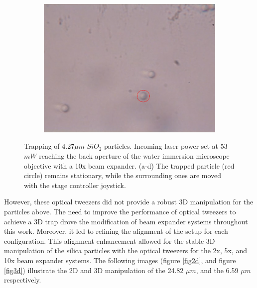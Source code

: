 \documentclass[letterpaper,12pt,oneside]{book}
\begin{document}
\begin{figure}[H]
\begin{subfigure}[b]{0.5\linewidth}
    \centering
    \includegraphics[scale=0.22]{427particles/4.png}
    \caption{}
    \label{fig7:d} 
  \end{subfigure} 
  \caption{Trapping of 4.27$\mu m$ $SiO_2$ particles. Incoming laser power set at 53 $mW$ reaching the back aperture of the water immersion microscope objective with a 10x beam expander. (a-d) The trapped particle (red circle) remains stationary, while the surrounding ones are moved with the stage controller joystick.}
  \label{figur427} 
\end{figure}
However, these optical tweezers did not provide a robust 3D manipulation for the particles above.
The need to improve the performance of optical tweezers to achieve a 3D trap drove the modification of beam expander systems throughout this work. Moreover, it led to refining the alignment of the setup for each configuration. This alignment enhancement allowed for the stable 3D manipulation of the silica particles with the optical tweezers for the 2x, 5x, and 10x beam expander systems. The following images (figure \ref{fig2d}, and figure \ref{fig3d}) illustrate the 2D and 3D manipulation of the 24.82 $\mu m$, and the 6.59 $\mu m$ respectively.
\end{document}
